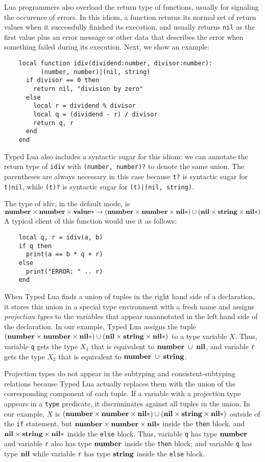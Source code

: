 Lua programmers also overload the return type of functions,
usually for signaling the occurence of errors.
In this idiom, a function returns its normal set of return values
when it successfully finished its execution,
and usually returns \texttt{nil} as the first value plus an
error message or other data that describes the error
when something failed during its execution.
Next, we show an example:
\begin{verbatim}
    local function idiv(dividend:number, divisor:number):
          (number, number)|(nil, string)
      if divisor == 0 then
        return nil, "division by zero"
      else
        local r = dividend % divisor
        local q = (dividend - r) / divisor
        return q, r
      end 
    end
\end{verbatim}

Typed Lua also includes a syntactic sugar for this idiom:
we can annotate the return type of \texttt{idiv} with
\texttt{(number, number)?} to denote the same union.
The parentheses are always necessary in this case because
\texttt{t?} is syntactic sugar for \texttt{t|nil},
while \texttt{(t)?} is syntactic sugar for \texttt{(t)|(nil, string)}.

The type of idiv, in the default mode, is
$\mathbf{number} \times \mathbf{number} \times \mathbf{value}{*} \rightarrow
(\mathbf{number} \times \mathbf{number} \times \mathbf{nil}{*}) \cup
(\mathbf{nil} \times \mathbf{string} \times \mathbf{nil}{*})$
A typical client of this function would use it as follows:
\begin{verbatim}
    local q, r = idiv(a, b)
    if q then
      print(a == b * q + r)
    else
      print("ERROR: " .. r)
    end
\end{verbatim}

When Typed Lua finds a union of tuples in the right hand side of
a declaration, it stores this union in a special type environment
with a fresh name and assigns \emph{projection types} to the
variables that appear unannotated in the left hand side of the declaration.
In our example, Typed Lua assigns the tuple
$(\mathbf{number} \times \mathbf{number} \times \mathbf{nil}{*}) \cup (\mathbf{nil} \times \mathbf{string} \times \mathbf{nil}{*})$
to a type variable $X$.
Thus, variable \texttt{q} gets the type $X_{1}$
that is equivalent to $\mathbf{number}\;\cup\;\mathbf{nil}$, 
and variable \texttt{r} gets the type $X_{2}$
that is equivalent to $\mathbf{number}\;\cup\;\mathbf{string}$. 

Projection types do not appear in the subtyping and consistent-subtyping
relations because Typed Lua actually replaces them with the union of the
corresponding component of each tuple.
If a variable with a projection type appears in a \texttt{type} predicate,
it discriminates against all tuples in the union.
In our example, $X$ is
$(\mathbf{number} \times \mathbf{number} \times \mathbf{nil}{*}) \cup (\mathbf{nil} \times \mathbf{string} \times \mathbf{nil}{*})$
outside of the \texttt{if} statement,
but $\mathbf{number} \times \mathbf{number} \times \mathbf{nil}{*}$ inside the \texttt{then} block,
and $\mathbf{nil} \times \mathbf{string} \times \mathbf{nil}{*}$ inside the \texttt{else} block.
Thus, variable \texttt{q} has type $\mathbf{number}$ and variable \texttt{r} also
has type $\mathbf{number}$ inside the \texttt{then} block;
and variable \texttt{q} has type $\mathbf{nil}$ while variable \texttt{r}
has type $\mathbf{string}$ inside the \texttt{else} block.

